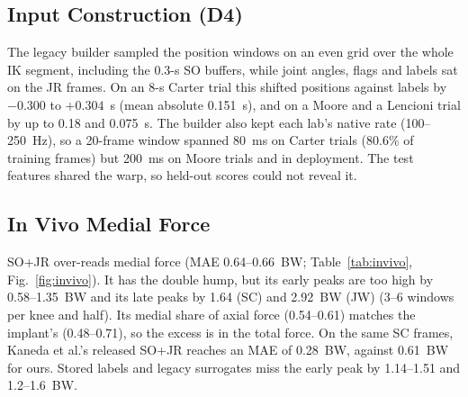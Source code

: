\subsection{Input Construction (D4)}\label{sec:res-d4}
The legacy builder sampled the position windows on an even grid over the whole IK segment,
including the 0.3-s SO buffers, while joint angles, flags and labels sat on the JR frames. On an
8-s Carter trial this shifted positions against labels by $-0.300$ to $+0.304$~s (mean
absolute 0.151~s), and on a Moore and a Lencioni trial by up to 0.18 and 0.075~s. The builder also
kept each lab's native rate (100--250~Hz), so a 20-frame window spanned 80~ms on Carter trials
(80.6\% of training frames) but 200~ms on Moore trials and in deployment. The test features shared
the warp, so held-out scores could not reveal it.

\subsection{In Vivo Medial Force}\label{sec:res-invivo}
SO+JR over-reads medial force (MAE 0.64--0.66~BW; Table~\ref{tab:invivo}, Fig.~\ref{fig:invivo}).
It has the double hump, but its early peaks are too high by 0.58--1.35~BW and its late peaks by
1.64 (SC) and 2.92~BW (JW) (3--6 windows per knee and half). Its medial share of axial force
(0.54--0.61) matches the implant's (0.48--0.71), so the excess is in the total force. On the same SC frames, Kaneda et al.'s released SO+JR reaches an MAE of 0.28~BW,
against 0.61~BW for ours. Stored labels and legacy surrogates miss the early peak by 1.14--1.51
and 1.2--1.6~BW.

